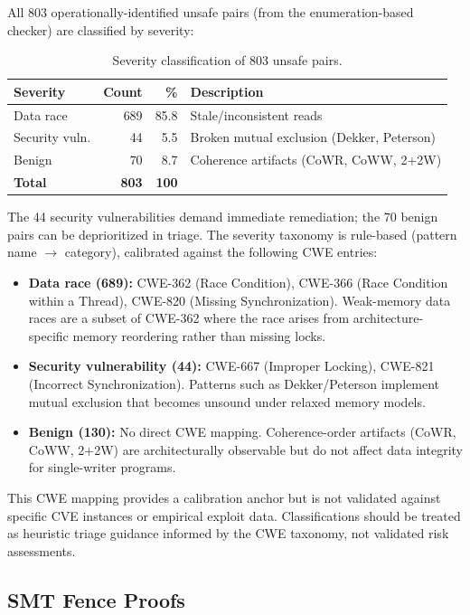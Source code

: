 \documentclass[11pt]{article}
\begin{document}
All 803 operationally-identified unsafe pairs (from the enumeration-based checker)
are classified by severity:

\begin{table}[ht]
\centering
\caption{Severity classification of 803 unsafe pairs.}
\label{tab:severity}
\small
\begin{tabular}{lrrl}
\toprule
\textbf{Severity} & \textbf{Count} & \textbf{\%} & \textbf{Description} \\
\midrule
Data race          & 689 & 85.8 & Stale/inconsistent reads \\
Security vuln.     & 44  & 5.5 & Broken mutual exclusion (Dekker, Peterson) \\
Benign             & 70 & 8.7 & Coherence artifacts (CoWR, CoWW, 2+2W) \\
\midrule
\textbf{Total}     & \textbf{803} & \textbf{100} & \\
\bottomrule
\end{tabular}
\end{table}

\noindent
The 44 security vulnerabilities demand immediate remediation; the
70 benign pairs can be deprioritized in triage.
The severity taxonomy is rule-based (pattern name $\to$ category),
calibrated against the following CWE entries:
\begin{itemize}[nosep]
\item \textbf{Data race (689):} CWE-362 (Race Condition), CWE-366
  (Race Condition within a Thread), CWE-820 (Missing Synchronization).
  Weak-memory data races are a subset of CWE-362 where the race arises
  from architecture-specific memory reordering rather than missing locks.
\item \textbf{Security vulnerability (44):} CWE-667 (Improper Locking),
  CWE-821 (Incorrect Synchronization). Patterns such as Dekker/Peterson
  implement mutual exclusion that becomes unsound under relaxed memory
  models.
\item \textbf{Benign (130):} No direct CWE mapping. Coherence-order
  artifacts (CoWR, CoWW, 2+2W) are architecturally observable but do
  not affect data integrity for single-writer programs.
\end{itemize}
\noindent
This CWE mapping provides a calibration anchor but is not validated
against specific CVE instances or empirical exploit data.
Classifications should be treated as heuristic triage guidance informed
by the CWE taxonomy, not validated risk assessments.

\subsection{SMT Fence Proofs}
\label{sec:fence-proofs}
\end{document}
